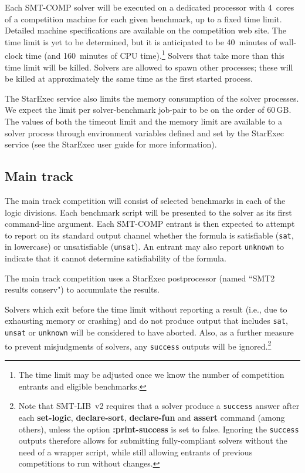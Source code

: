 \documentclass[12pt]{article}
\newcommand{\akey}[1]{\textbf{#1}}
\begin{document}
%
Each SMT-COMP solver will be executed on a dedicated processor with
4~cores of a competition machine for each given benchmark, up to a
fixed time limit.  Detailed machine specifications are available on
the competition web site.  The time limit is yet to be determined, but
it is anticipated to be 40~minutes of wall-clock time (and 160~minutes
of CPU time).\footnote{The time limit may be adjusted once we know the
  number of competition entrants and eligible benchmarks.}  Solvers
that take more than this time limit will be killed.  Solvers are
allowed to spawn other processes; these will be killed at
approximately the same time as the first started process.

The StarExec service also limits the memory consumption of the solver
processes.  We expect the limit per solver-benchmark job-pair to be on
the order of 60\,GB.  The values of both the timeout limit and the
memory limit are available to a solver process through environment
variables defined and set by the StarExec service (see the StarExec
user guide for more information).

\subsection{Main track}
\label{sec:exec:main}

The main track competition will consist of selected benchmarks in each
of the logic divisions.  Each benchmark script will be presented to
the solver as its first command-line argument.  Each SMT-COMP entrant
is then expected to attempt to report on its standard output channel
whether the formula is satisfiable (\texttt{sat}, in lowercase) or
unsatisfiable (\texttt{unsat}).  An entrant may also report
\texttt{unknown} to indicate that it cannot determine satisfiability
of the formula.

The main track competition uses a StarExec postprocessor (named ``SMT2
results conserv") to accumulate the results.

%
Solvers which exit before the time limit without reporting a result
(i.e., due to exhausting memory or crashing) and do not produce output
that includes \texttt{sat}, \texttt{unsat} or \texttt{unknown} will be
considered to have aborted.  Also, as a further measure to prevent
misjudgments of solvers, any \texttt{success} outputs will be
ignored.\footnote{ Note that SMT-LIB~v2 requires that a solver produce
  a \texttt{success} answer after each \akey{set-logic},
  \akey{declare-sort}, \akey{declare-fun} and \akey{assert} command
  (among others), unless the option \akey{:print-success} is set to
  false.  Ignoring the \texttt{success} outputs therefore allows for
  submitting fully-compliant solvers without the need of a wrapper
  script, while still allowing entrants of previous competitions to
  run without changes.}
\end{document}
